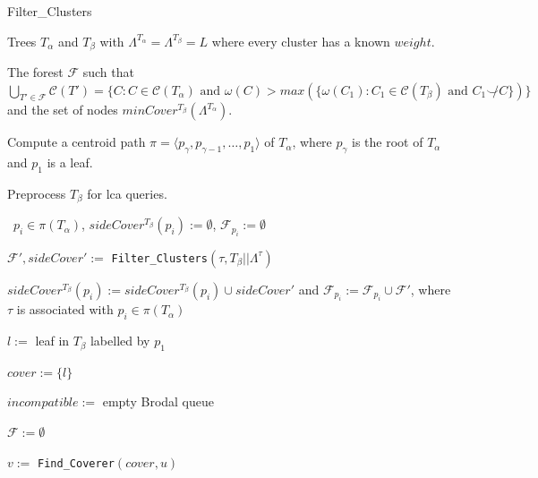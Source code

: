 \documentclass{article}
\newcommand{\compatible}{\smile}
\newcommand{\leafset}{\Lambda}
\newcommand{\weight}{\omega}
\newcommand{\TA}{T_\alpha}
\newcommand{\TB}{T_\beta}
\begin{document}
    \begin{algorithm}[!ht]
        \caption{Filter\_Clusters}
        \label{alg:filterclusters}

        \begin{algorithmic}[1]
            \Input Trees $\TA$ and $\TB$ with $\leafset^{\TA} = \leafset^{\TB} = L$ where every cluster has a known $weight$.

            \Output The forest $\mathcal{F}$ such that $\bigcup_{T' \in \mathcal{F}} \mathcal{C}(T') = \{C : C \in \mathcal{C}(\TA) \text{ and } \weight(C) > max(\{\weight(C_1) : C_1 \in \mathcal{C}(\TB) \text{ and } C_1 \not\compatible C\})\}$ and the set of nodes $minCover^{\TB}(\leafset^{\TA})$.

            \State Compute a centroid path $\pi = \langle p_{\gamma}, p_{\gamma - 1}, \dots, p_1 \rangle$ of $\TA$, where $p_{\gamma}$ is the root of $\TA$ and $p_1$ is a leaf.
            \label{step:centroidpath}

            \State Preprocess $\TB$ for lca queries.
            \label{step:preprocesslca}

            \State \algorithmicforall\ $p_i \in \pi(\TA)$, $sideCover^{\TB}(p_i) := \emptyset$, $\mathcal{F}_{p_i} := \emptyset$

            \ForAll{$\tau \in \sigma(\TA)$}
                \State $\mathcal{F}', sideCover' :=$ \texttt{Filter\_Clusters}$(\tau, \TB||\leafset^{\tau})$
                \label{step:recursivecall}

                \State $sideCover^{\TB}(p_i) := sideCover^{\TB}(p_i) \cup sideCover'$ and $\mathcal{F}_{p_i} := \mathcal{F}_{p_i} \cup \mathcal{F}'$, where $\tau$ is associated with \hspace*{\algorithmicindent}$p_i \in \pi(\TA)$
                \label{step:obtainsidecover}
            \EndFor

            \State $l :=$ leaf in $\TB$ labelled by $p_1$

            \State $cover := \{l\}$
            \label{step:p1cover}

            \State $incompatible :=$ empty Brodal queue
            \label{step:p1incompatible}

            \State $\mathcal{F} := \emptyset$

                \label{step:outerfor}
                \ForAll{$u \in sideCover^{\TB}(p_i)$}
                    \label{step:innerfor}

                    \State $v :=$ \texttt{Find\_Coverer}$(cover, u)$
                    \label{step:findcoverer}


\end{algorithmic}
\end{algorithm}
\end{document}
